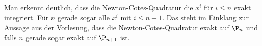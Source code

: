 \documentclass[a4paper]{scrartcl}
\begin{document}
\begin{aufgabe}
\begin{enumerate}[a)]
			Man erkennt deutlich, dass die Newton-Cotes-Quadratur die $x^i$ für $i \le n$ exakt integriert.						
			Für $n$ gerade sogar alle $x^i$ mit $i \le n+1$.
			Das steht im Einklang zur Aussage aus der Vorlesung, dass die Newton-Cotes-Quadratur exakt auf $\P_n$ und falls $n$ gerade sogar exakt auf $\P_{n+1}$ ist.
	\end{enumerate}
	
\end{aufgabe}
\end{document}
